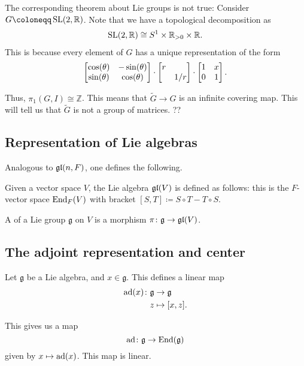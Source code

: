 \documentclass[12pt]{article}
\begin{document}
\begin{rem}
	The corresponding theorem about Lie groups is not true: Consider $G \coloneqq \SL(2, \mathbb{R})$. 
	Note that we have a topological decomposition as
	\begin{align*} 
		\operatorname{SL}(2, \mathbb{R}) \cong S^{1} \times \mathbb{R}_{> 0} \times \mathbb{R}.
	\end{align*}
	This is because every element of $G$ has a unique representation of the form
	\begin{equation*} 
		\begin{bmatrix} \cos(\theta) & -\sin(\theta) \\ \sin(\theta) & \cos(\theta) \end{bmatrix} \cdot \begin{bmatrix} r &  \\  & 1/r \end{bmatrix} \cdot \begin{bmatrix} 1 & x \\ 0 & 1 \end{bmatrix}.
	\end{equation*}

	Thus, $\pi_{1}(G, I) \cong \mathbb{Z}$. 
	This means that $\widetilde{G} \to G$ is an infinite covering map. 
	This will tell us that $\widetilde{G}$ is not a group of matrices. ??
\end{rem}

\subsection{Representation of Lie algebras}

Analogous to $\mathfrak{gl}(n, F)$, one defines the following.
\begin{defn}
	Given a vector space $V$, the Lie algebra $\mathfrak{gl}(V)$ is defined as follows: this is the $F$-vector space $\operatorname{End}_{F}(V)$ with bracket $[S, T] \coloneqq S \circ T - T \circ S$.
\end{defn}

\begin{defn}
	A  of a Lie group $\mathfrak{g}$ on $V$ is a morphism $\pi \colon \mathfrak{g} \to \mathfrak{gl}(V)$.
\end{defn}

\subsection{The adjoint representation and center}

Let $\mathfrak{g}$ be a Lie algebra, and $x \in \mathfrak{g}$. 
This defines a linear map 
\begin{align*} 
	\operatorname{ad}(x) \colon \mathfrak{g} & \to \mathfrak{g} \\
	z & \mapsto [x, z].
\end{align*}

This gives us a map 
\begin{equation} \label{eq:ad}
	\operatorname{ad} \colon \mathfrak{g} \to \operatorname{End}(\mathfrak{g})
\end{equation} 
given by $x \mapsto \operatorname{ad}(x)$. 
This map is linear.
\end{document}
